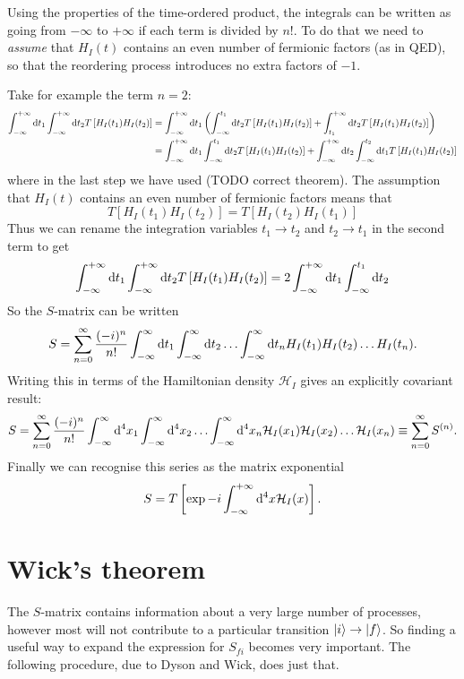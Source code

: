 Using the properties of the time-ordered product, the integrals can be written as going from $-\infty$ to $+\infty$ if each term is divided by $n!$. To do that we need to \textit{assume} that $H_I(t)$ contains an even number of fermionic factors (as in QED), so that the reordering process introduces no extra factors of $-1$.

Take for example the term $n=2$:
\begin{align*}
\int_{-\infty}^{+\infty}\diff{t_1}\int_{-\infty}^{+\infty}\diff{t_2}T\left[H_I(t_1)H_I(t_2)\right] &= \int_{-\infty}^{+\infty}\diff{t_1}\left(\int_{-\infty}^{t_1}\diff{t_2}T\left[H_I(t_1)H_I(t_2)\right] + \int_{t_1}^{+\infty}\diff{t_2}T\left[H_I(t_1)H_I(t_2)\right]\right) \\
&= \int_{-\infty}^{+\infty}\diff{t_1}\int_{-\infty}^{t_1}\diff{t_2}T\left[H_I(t_1)H_I(t_2)\right] + \int_{-\infty}^{+\infty}\diff{t_2}\int_{-\infty}^{t_2}\diff{t_1}T\left[H_I(t_1)H_I(t_2)\right]
\end{align*}
where in the last step we have used (TODO correct theorem). The assumption that $H_I(t)$ contains an even number of fermionic factors means that
\[ T\left[H_I(t_1)H_I(t_2)\right] = T\left[H_I(t_2)H_I(t_1)\right] \]
Thus we can rename the integration variables $t_1 \to t_2$ and $t_2 \to t_1$ in the second term to get
\[ \int_{-\infty}^{+\infty}\operatorname{d \!}{t_1}\int_{-\infty}^{+\infty}\operatorname{d \!}{t_2}T\left[H_I(t_1)H_I(t_2)\right] = 2\int_{-\infty}^{+\infty}\operatorname{d \!}{t_1}\int_{-\infty}^{t_1}\operatorname{d \!}{t_2}\]
So the $S$-matrix can be written
\[ S = \sum_{n=0}^\infty \frac{(-i)^n}{n!} \int^{\infty}_{-\infty}\operatorname{d \!}{t_1}\int_{-\infty}^{\infty}\operatorname{d \!}{t_2} \ldots \int_{-\infty}^{\infty}\operatorname{d \!}{t_n}H_I(t_1)H_I(t_2)\ldots H_I(t_n). \]
Writing this in terms of the Hamiltonian density $\mathcal{H}_I$ gives an explicitly covariant result:
\[ S = \sum_{n=0}^\infty \frac{(-i)^n}{n!} \int^{\infty}_{-\infty}\operatorname{d \!}{^4x_1}\int_{-\infty}^{\infty}\operatorname{d \!}{^4x_2} \ldots \int_{-\infty}^{\infty}\operatorname{d \!}{^4x_n}\mathcal{H}_I(x_1)\mathcal{H}_I(x_2)\ldots \mathcal{H}_I(x_n) \equiv \sum_{n=0}^\infty S^{(n)}. \]
Finally we can recognise this series as the matrix exponential
\[ S = T\left[\exp{-i\int^{+\infty}_{-\infty}\operatorname{d \!}{^4x}\mathcal{H}_I(x)}\right]. \]

\section{Wick's theorem}
The $S$-matrix contains information about a very large number of processes, however most will not contribute to a particular transition $\left| i \right\rangle \to \left| f \right\rangle$. So finding a useful way to expand the expression for $S_{fi}$ becomes very important. The following procedure, due to Dyson and Wick, does just that.

